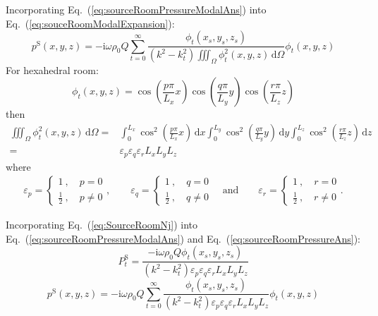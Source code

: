 \documentclass[a4paper,UTF8]{ctexart}
\begin{document}
	Incorporating Eq.~(\ref{eq:sourceRoomPressureModalAns}) into Eq.~(\ref{eq:souceRoomModalExpansion}):
	\begin{equation}
	\label{eq:sourceRoomPressureAns}
	p^\mathrm{S}\left(x,y,z\right)
	= -\mathrm i\omega\rho_0Q\sum_{t=0}^{\infty}
		\frac{\phi_t\left( x_s,y_s,z_s\right)}
		{\left(k^2-k_t^2 \right) 
			\iiint_\Omega \phi_t^2\left( x,y,z\right) \,\mathrm d\Omega }
		\phi_t\left( x,y,z\right)
	\end{equation}
	For hexahedral room:
	\begin{equation}
	\label{eq:hexahedralSourceRoom}
	\phi_t\left(x,y,z\right)
	= \cos\left(\frac{p\pi}{L_x}x\right)
	\cos\left(\frac{q\pi}{L_y}y\right)
	\cos\left(\frac{r\pi}{L_z}z\right)
	\end{equation}
	then
	\begin{equation}
	\label{eq:SourceRoomNj}
	\begin{split}
	\iiint_\Omega \phi_t^2\left( x,y,z\right) \,\mathrm d\Omega 
	=& 	\int_0^{L_x} \cos^2 \left(\frac{p\pi}{L_x}x\right) \,\mathrm dx
		\int_0^{L_y} \cos^2 \left(\frac{q\pi}{L_y}y\right) \,\mathrm dy
		\int_0^{L_z} \cos^2 \left(\frac{r\pi}{L_z}z\right) \,\mathrm dz\\
	=& \varepsilon_p\varepsilon_q\varepsilon_r L_x L_y L_z
	\end{split}
	\end{equation}
	where
	\begin{gather*}
	\varepsilon_p = \begin{cases}
	1\ ,\quad p=0\\
	\frac 12\ ,\quad p\neq 0
	\end{cases},\qquad
	\varepsilon_q = \begin{cases}
	1\ ,\quad q=0\\
	\frac 12\ ,\quad q\neq 0
	\end{cases}\quad \text{and}\quad\quad
	\varepsilon_r = \begin{cases}
	1\ ,\quad r=0\\
	\frac 12\ ,\quad r\neq 0
	\end{cases}.
	\end{gather*}
	
	Incorporating Eq.~(\ref{eq:SourceRoomNj}) into Eq.~(\ref{eq:sourceRoomPressureModalAns}) and Eq.~(\ref{eq:sourceRoomPressureAns}):
	\begin{equation}
	\label{eq:sourceRoomPressureModalAnsSim}
	P_t^\mathrm{S}
	= \frac{-\mathrm i\omega\rho_0Q\phi_t\left( x_s,y_s,z_s\right)}
	{\left(k^2-k_t^2 \right) 
		\varepsilon_p\varepsilon_q\varepsilon_r L_x L_y L_z }
	\end{equation}
	\begin{equation}
	\label{eq:sourceRoomPressureAnsSim}
	p^\mathrm{S}\left(x,y,z\right)
	= -\mathrm i\omega\rho_0Q\sum_{t=0}^{\infty}
	\frac{\phi_t\left( x_s,y_s,z_s\right)}
	{\left(k^2-k_t^2 \right) 
		\varepsilon_p\varepsilon_q\varepsilon_r L_x L_y L_z }
	\phi_t\left( x,y,z\right)
	\end{equation}
	
\end{document}
